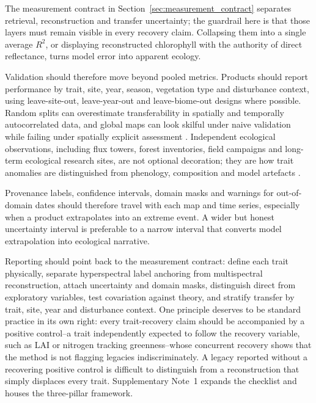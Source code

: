 \documentclass[pdflatex,sn-mathphys-num]{sn-jnl}
\begin{document}
The measurement contract in Section~\ref{sec:measurement_contract} separates retrieval, reconstruction and transfer uncertainty; the guardrail here is that those layers must remain visible in every recovery claim. Collapsing them into a single average $R^2$, or displaying reconstructed chlorophyll with the authority of direct reflectance, turns model error into apparent ecology.

Validation should therefore move beyond pooled metrics. Products should report performance by trait, site, year, season, vegetation type and disturbance context, using leave-site-out, leave-year-out and leave-biome-out designs where possible. Random splits can overestimate transferability in spatially and temporally autocorrelated data, and global maps can look skilful under naive validation while failing under spatially explicit assessment \cite{roberts2017crossvalidation,ploton2020spatial,meyer2022maps}. Independent ecological observations, including flux towers, forest inventories, field campaigns and long-term ecological research sites, are not optional decoration; they are how trait anomalies are distinguished from phenology, composition and model artefacts \cite{baldocchi2001fluxnet,mirtl2018genesis,tai2023linking}.

Provenance labels, confidence intervals, domain masks and warnings for out-of-domain dates should therefore travel with each map and time series, especially when a product extrapolates into an extreme event. A wider but honest uncertainty interval is preferable to a narrow interval that converts model extrapolation into ecological narrative.

Reporting should point back to the measurement contract: define each trait physically, separate hyperspectral label anchoring from multispectral reconstruction, attach uncertainty and domain masks, distinguish direct from exploratory variables, test covariation against theory, and stratify transfer by trait, site, year and disturbance context. One principle deserves to be standard practice in its own right: every trait-recovery claim should be accompanied by a positive control--a trait independently expected to follow the recovery variable, such as LAI or nitrogen tracking greenness--whose concurrent recovery shows that the method is not flagging legacies indiscriminately. A legacy reported without a recovering positive control is difficult to distinguish from a reconstruction that simply displaces every trait. Supplementary Note~1 expands the checklist and houses the three-pillar framework.
\end{document}
